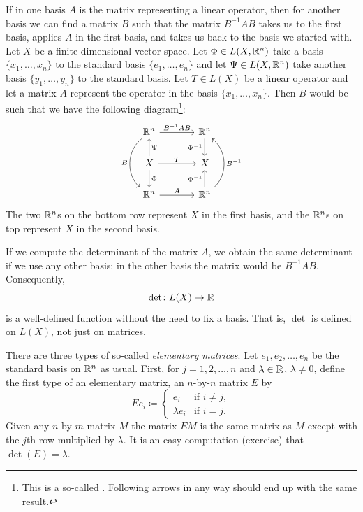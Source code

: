 If in one basis $A$ is the matrix representing a
linear operator, then for another basis we can find a matrix $B$ such
that the matrix $B^{-1}AB$ takes us to the first basis, applies $A$ in the
first basis, and takes us back to the basis we started with.
Let $X$ be a finite-dimensional vector space.
Let $\Phi \in L(X,{\mathbb{R}}^n)$ take a basis $\{ x_1,\ldots,x_n \}$ to the
standard basis $\{ e_1,\ldots,e_n \}$ and let $\Psi \in L(X,{\mathbb{R}}^n)$
take another basis $\{ y_1, \ldots, y_n \}$ to the standard basis.
Let $T \in L(X)$ be a linear operator and let a matrix $A$
represent the operator
in the basis $\{ x_1,\ldots,x_n \}$.
Then $B$ would be such that we have the following diagram\footnote{%
This is a so-called \emph{}.
Following arrows in any way should end up with the same result.}:
\begin{equation*}
\begin{tikzcd}[row sep=normal,column sep=large]
\R^n \ar[r, "B^{-1}AB"]  \ar[dd, bend right=50, "B"'] &
  \R^n \ar[d, "\Psi^{-1}"'] \\
X \ar[r, "T"] \ar[u, "\Psi"'] \ar[d, "\Phi"]        &
  X \\
\R^n \ar[r, "A"]                                      &
  \R^n \ar[u, "\Phi^{-1}"] \ar[uu, bend right=50, "B^{-1}"'] 
\end{tikzcd}
\end{equation*}
The two ${\mathbb{R}}^n$s on the bottom row represent
$X$ in the first basis, and the ${\mathbb{R}}^n$s on top represent $X$ in the
second
basis.

If we compute the determinant of the matrix $A$, we obtain
the same determinant if we use any other basis;
in the other basis the matrix would be $B^{-1}AB$.
Consequently,
\begin{equation*}
\det \colon L(X) \to \R
\avoidbreak
\end{equation*}
is a well-defined function without the need to fix a basis.
That is, $\det$ is defined on $L(X)$, not just on matrices.

\medskip

There are three types of so-called
\emph{elementary matrices}.
Let
$e_1,e_2,\ldots,e_n$ be the standard basis on ${\mathbb{R}}^n$ as usual.
First,
for $j =
1,2,\ldots,n$ and
$\lambda \in {\mathbb{R}}$, $\lambda \neq 0$, define
the first type of an elementary matrix,
an
$n$-by-$n$ matrix $E$ by
\begin{equation*}
Ee_i \coloneqq 
\begin{cases}
e_i & \text{if } i \neq j , \\
\lambda e_i & \text{if } i = j .
\end{cases}
\end{equation*}
Given any $n$-by-$m$ matrix $M$ the matrix $EM$ is the same matrix as $M$
except with the $j$th row multiplied by $\lambda$.
It is an easy computation (exercise) that $\det(E) = \lambda$.

